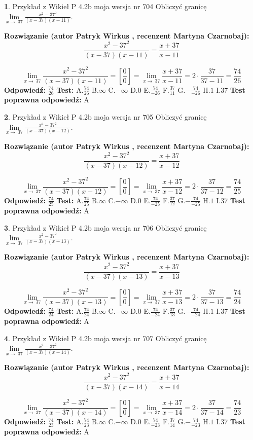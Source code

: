 \documentclass[12pt, a4paper]{article}
\theoremstyle{definition} %
\newtheorem{zad}{}
\newcommand{\zadStart}[1]{\begin{zad}#1\newline}
\newcommand{\zadStop}{\end{zad}}
\newcommand{\rozwStart}[2]{\noindent \textbf{Rozwiązanie (autor #1 , recenzent #2): }\newline}
\newcommand{\rozwStop}{\newline}
\newcommand{\odpStart}{\noindent \textbf{Odpowiedź:}\newline}
\newcommand{\odpStop}{\newline}
\newcommand{\testStart}{\noindent \textbf{Test:}\newline}
\newcommand{\testStop}{\newline}
\newcommand{\kluczStart}{\noindent \textbf{Test poprawna odpowiedź:}\newline}
\newcommand{\kluczStop}{\newline}
\begin{document}
\zadStart{Przykład z Wikieł P 4.2b moja wersja nr 704}
Obliczyć granicę $\lim\limits_{x\to\ 37}\frac{x^{2}-37^{2}}{(x-37)(x-11)}$.
\zadStop
\rozwStart{Patryk Wirkus}{Martyna Czarnobaj}
$$\frac{x^{2}-37^{2}}{(x-37)(x-11)}=\frac{x+37}{x-11}$$

$$\lim\limits_{x\to\ 37}\frac{x^{2}-37^{2}}{(x-37)(x-11)}=[\frac{0}{0}]=\lim\limits_{x\to\ 37}\frac{x+37}{x-11}=2 \cdot \frac{37}{37-11} = \frac{74}{26}$$
\rozwStop
\odpStart
$\frac{74}{26}$
\odpStop
\testStart
A.$\frac{74}{26}$
B.$\infty$
C.$-\infty$
D.$0$
E.$\frac{74}{-26}$
F.$\frac{37}{11}$
G.$-\frac{74}{-26}$
H.$1$
I.$37$
\testStop
\kluczStart
A
\kluczStop



\zadStart{Przykład z Wikieł P 4.2b moja wersja nr 705}
Obliczyć granicę $\lim\limits_{x\to\ 37}\frac{x^{2}-37^{2}}{(x-37)(x-12)}$.
\zadStop
\rozwStart{Patryk Wirkus}{Martyna Czarnobaj}
$$\frac{x^{2}-37^{2}}{(x-37)(x-12)}=\frac{x+37}{x-12}$$

$$\lim\limits_{x\to\ 37}\frac{x^{2}-37^{2}}{(x-37)(x-12)}=[\frac{0}{0}]=\lim\limits_{x\to\ 37}\frac{x+37}{x-12}=2 \cdot \frac{37}{37-12} = \frac{74}{25}$$
\rozwStop
\odpStart
$\frac{74}{25}$
\odpStop
\testStart
A.$\frac{74}{25}$
B.$\infty$
C.$-\infty$
D.$0$
E.$\frac{74}{-25}$
F.$\frac{37}{12}$
G.$-\frac{74}{-25}$
H.$1$
I.$37$
\testStop
\kluczStart
A
\kluczStop



\zadStart{Przykład z Wikieł P 4.2b moja wersja nr 706}
Obliczyć granicę $\lim\limits_{x\to\ 37}\frac{x^{2}-37^{2}}{(x-37)(x-13)}$.
\zadStop
\rozwStart{Patryk Wirkus}{Martyna Czarnobaj}
$$\frac{x^{2}-37^{2}}{(x-37)(x-13)}=\frac{x+37}{x-13}$$

$$\lim\limits_{x\to\ 37}\frac{x^{2}-37^{2}}{(x-37)(x-13)}=[\frac{0}{0}]=\lim\limits_{x\to\ 37}\frac{x+37}{x-13}=2 \cdot \frac{37}{37-13} = \frac{74}{24}$$
\rozwStop
\odpStart
$\frac{74}{24}$
\odpStop
\testStart
A.$\frac{74}{24}$
B.$\infty$
C.$-\infty$
D.$0$
E.$\frac{74}{-24}$
F.$\frac{37}{13}$
G.$-\frac{74}{-24}$
H.$1$
I.$37$
\testStop
\kluczStart
A
\kluczStop



\zadStart{Przykład z Wikieł P 4.2b moja wersja nr 707}
Obliczyć granicę $\lim\limits_{x\to\ 37}\frac{x^{2}-37^{2}}{(x-37)(x-14)}$.
\zadStop
\rozwStart{Patryk Wirkus}{Martyna Czarnobaj}
$$\frac{x^{2}-37^{2}}{(x-37)(x-14)}=\frac{x+37}{x-14}$$

$$\lim\limits_{x\to\ 37}\frac{x^{2}-37^{2}}{(x-37)(x-14)}=[\frac{0}{0}]=\lim\limits_{x\to\ 37}\frac{x+37}{x-14}=2 \cdot \frac{37}{37-14} = \frac{74}{23}$$
\rozwStop
\odpStart
$\frac{74}{23}$
\odpStop
\testStart
A.$\frac{74}{23}$
B.$\infty$
C.$-\infty$
D.$0$
E.$\frac{74}{-23}$
F.$\frac{37}{14}$
G.$-\frac{74}{-23}$
H.$1$
I.$37$
\testStop
\kluczStart
A
\kluczStop
\end{document}
